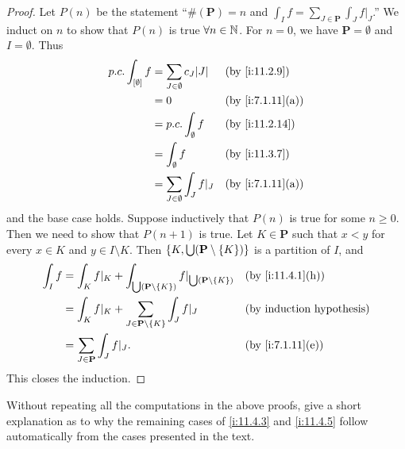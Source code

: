 \begin{proof}
  Let \(P(n)\) be the statement ``\(\#(\mathbf{P}) = n\) and \(\int_I f = \sum_{J \in \mathbf{P}} \int_J f|_J\).''
  We induct on \(n\) to show that \(P(n)\) is true \(\forall n \in \mathbb{N}\).
  For \(n = 0\), we have \(\mathbf{P} = \emptyset\) and \(I = \emptyset\).
  Thus
  \begin{align*}
    p.c. \int_{[\emptyset]} f & = \sum_{J \in \emptyset} c_J \abs{J} &  & \by{i:11.2.9}    \\
                              & = 0                                  &  & \by{i:7.1.11}[a] \\
                              & = p.c. \int_{\emptyset} f            &  & \by{i:11.2.14}   \\
                              & = \int_{\emptyset} f                 &  & \by{i:11.3.7}    \\
                              & = \sum_{J \in \emptyset} \int_J f|_J &  & \by{i:7.1.11}[a]
  \end{align*}
  and the base case holds.
  Suppose inductively that \(P(n)\) is true for some \(n \geq 0\).
  Then we need to show that \(P(n + 1)\) is true.
  Let \(K \in \mathbf{P}\) such that \(x < y\) for every \(x \in K\) and \(y \in I \setminus K\).
  Then \(\left\lbrace K, \bigcup (\mathbf{P} \setminus \left\lbrace K\right\rbrace)\right\rbrace\) is a partition of \(I\), and
  \begin{align*}
    \int_I f & = \int_K f|_K + \int_{\bigcup (\mathbf{P} \setminus \set{K})} f|_{\bigcup (\mathbf{P} \setminus \set{K})} &  & \by{i:11.4.1}[h] \\
             & = \int_K f|_K + \sum_{J \in \mathbf{P} \setminus \set{K}} \int_J f|_J                                     &  & \byIH            \\
             & = \sum_{J \in \mathbf{P}} \int_J f|_J.                                                                    &  & \by{i:7.1.11}[e]
  \end{align*}
  This closes the induction.
\end{proof}

\begin{ex}\label{i:ex:11.4.4}
  Without repeating all the computations in the above proofs, give a short explanation as to why the remaining cases of \cref{i:11.4.3} and \cref{i:11.4.5} follow automatically from the cases presented in the text.
\end{ex}

